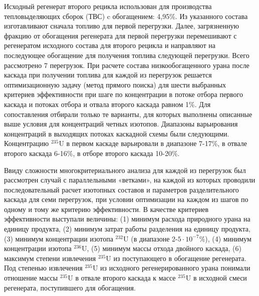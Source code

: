 Исходный регенерат второго рецикла использован для производства тепловыделяющих сборок (ТВС) c обогащением: 4,95\%. Из указанного состава изготавливают сначала топливо для первой перегрузки. Далее, загрязненную фракцию от обогащения регенерата для первой перегрузки перемешивают с регенератом исходного состава для второго рецикла и направляют на последующее обогащение для получения топлива следующей перегрузки. Всего рассмотрено 7 перегрузок. При расчете состава низкообогащенного урана после каскада при получении топлива для каждой из перегрузок решается оптимизационную задачу (метод прямого поиска) для шести выбранных критериев эффективности при шаге по концентрации в потоке отбора первого каскада и потоках отбора и отвала второго каскада равном 1\%. Для сопоставления отбирали только те варианты, для которых выполнены описанные выше условия для концентраций четных изотопов. Диапазоны варьирования концентраций в выходящих потоках каскадной схемы были следующими. Концентрацию $^{235}$U в первом каскаде варьировали в диапазоне 7-17\%, в отвале второго каскада 6-16\%, в отборе второго каскада 10-20\%.

Ввиду сложности многокритериального анализа для каждой из перегрузок был рассмотрен случай с параллельными «ветками», на каждой из которых проводили последовательный расчет изотопных составов и параметров разделительного каскада для семи перегрузок, при условии оптимизации на каждом из шагов по одному и тому же критерию эффективности. В качестве критериев эффективности выступали величины: (1) минимум расхода природного урана на единицу продукта, (2) минимум затрат работы разделения на единицу продукта, (3) минимум концентрации изотопа $^{232}$U (в диапазоне 2-$5\cdot10^{-7}$\%), (4) минимум концентрации изотопа $^{236}$U, (5) минимум массы отхода двойного каскада, (6) максимум степени извлечения $^{235}$U из поступающего в обогащение регенерата. Под степенью извлечения $^{235}$U из исходного регенерированного урана понимали отношение массы $^{235}$U в отвале второго каскада к массе $^{235}$U в исходной смеси регенерата, поступившего для обогащения.

